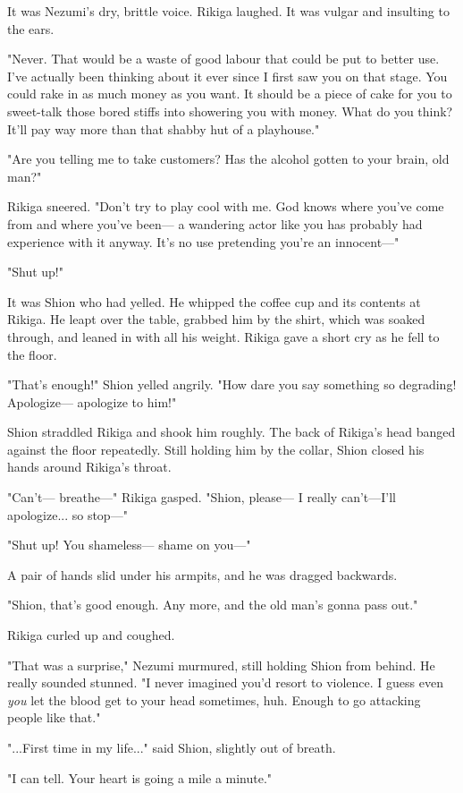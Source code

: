 It was Nezumi's dry, brittle voice. Rikiga laughed. It was vulgar and
insulting to the ears.

"Never. That would be a waste of good labour that could be put to better
use. I've actually been thinking about it ever since I first saw you on
that stage. You could rake in as much money as you want. It should be a
piece of cake for you to sweet-talk those bored stiffs into showering
you with money. What do you think? It'll pay way more than that shabby
hut of a playhouse."

"Are you telling me to take customers? Has the alcohol gotten to your
brain, old man?"

Rikiga sneered. "Don't try to play cool with me. God knows where you've
come from and where you've been--- a wandering actor like you has probably
had experience with it anyway. It's no use pretending you're an
innocent---"

"Shut up!"

It was Shion who had yelled. He whipped the coffee cup and its contents
at Rikiga. He leapt over the table, grabbed him by the shirt, which was
soaked through, and leaned in with all his weight. Rikiga gave a short
cry as he fell to the floor.

"That's enough!" Shion yelled angrily. "How dare you say something so
degrading! Apologize--- apologize to him!"

Shion straddled Rikiga and shook him roughly. The back of Rikiga's head
banged against the floor repeatedly. Still holding him by the collar,
Shion closed his hands around Rikiga's throat.

"Can't--- breathe---" Rikiga gasped. "Shion, please--- I really can't---I'll
apologize... so stop---"

"Shut up! You shameless--- shame on you---"

A pair of hands slid under his armpits, and he was dragged backwards.

"Shion, that's good enough. Any more, and the old man's gonna pass out."

Rikiga curled up and coughed.

"That was a surprise," Nezumi murmured, still holding Shion from behind.
He really sounded stunned. "I never imagined you'd resort to violence. I
guess even \emph{you} let the blood get to your head sometimes, huh. Enough to
go attacking people like that."

"...First time in my life..." said Shion, slightly out of breath.

"I can tell. Your heart is going a mile a minute."

